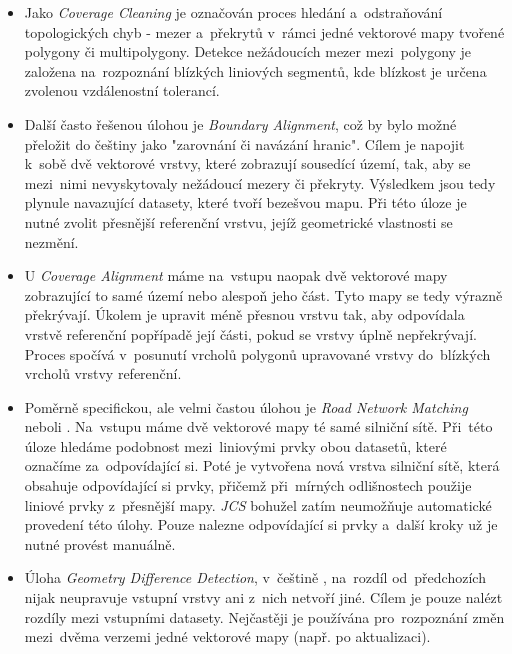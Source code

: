 \begin{itemize}[leftmargin=*]
 \item Jako \textit{Coverage Cleaning} je  označován proces hledání
    a~odstraňování topologických chyb - mezer a~překrytů v~rámci jedné
    vektorové mapy tvořené polygony či multipolygony. Detekce nežádoucích
    mezer mezi~polygony je založena na~rozpoznání blízkých liniových segmentů,
    kde blízkost je určena zvolenou vzdálenostní tolerancí. 

 \item Další často řešenou úlohou je \textit{Boundary Alignment}, což by
    bylo možné přeložit do češtiny jako "zarovnání či navázání hranic". 
    Cílem je napojit k~sobě dvě vektorové vrstvy, které zobrazují sousedící
    území, tak, aby se mezi~nimi nevyskytovaly nežádoucí mezery či překryty.
    Výsledkem jsou tedy plynule navazující datasety, které tvoří bezešvou mapu.
    Při této úloze je nutné zvolit přesnější referenční vrstvu, jejíž 
    geometrické vlastnosti se nezmění.

 \item U \textit{Coverage Alignment} máme na~vstupu naopak dvě vektorové
    mapy zobrazující to samé území nebo alespoň jeho část. Tyto mapy se 
    tedy výrazně překrývají. Úkolem je upravit méně přesnou vrstvu tak,
    aby odpovídala vrstvě referenční popřípadě její části, pokud se vrstvy
    úplně nepřekrývají. Proces spočívá v~posunutí vrcholů polygonů upravované
    vrstvy do~blízkých vrcholů vrstvy referenční.

 \item Poměrně specifickou, ale velmi častou úlohou je \textit{Road Network 
    Matching} neboli . Na~vstupu máme dvě 
    vektorové mapy té samé silniční sítě. Při~této úloze hledáme podobnost
    mezi~liniovými prvky obou datasetů, které označíme za~odpovídající si.
    Poté je vytvořena nová vrstva silniční sítě, která obsahuje odpovídající
    si prvky, přičemž při~mírných odlišnostech použije liniové prvky z~přesnější
    mapy. \textit{JCS} bohužel zatím neumožňuje automatické provedení této
    úlohy. Pouze nalezne odpovídající si prvky a~další kroky už je nutné provést
    manuálně.

\item Úloha \textit{Geometry Difference Detection}, v~češtině , na~rozdíl od~předchozích nijak neupravuje vstupní
    vrstvy ani z~nich netvoří jiné. Cílem je pouze nalézt rozdíly mezi vstupními
    datasety. Nejčastěji je používána pro~rozpoznání změn mezi~dvěma verzemi
    jedné vektorové mapy (např. po aktualizaci).
\end{itemize}

